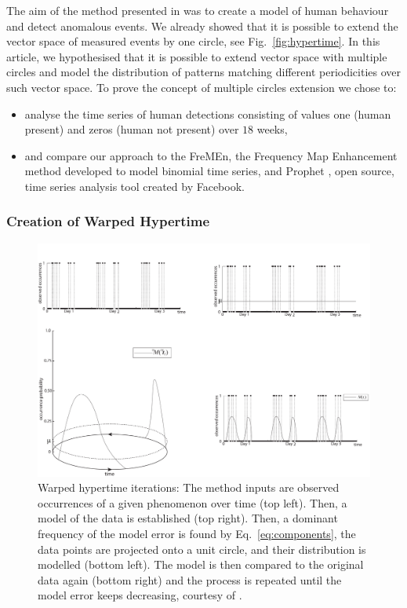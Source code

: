 The aim of the method presented in \cite{Vintr2018Spatiotemporal} was to create a model of human behaviour and detect anomalous events. 
We already showed that it is possible to extend the vector space of measured events by one circle, see Fig.~\ref{fig:hypertime}.
In this article, we hypothesised that it is possible to extend vector space with multiple circles and model the distribution of patterns matching different periodicities over such vector space.
To prove the concept of multiple circles extension we chose to: 
\begin{itemize}
    \item analyse the time series of human detections consisting of values one (human present) and zeros (human not present) over $18$ weeks, 
    \item and compare our approach to the FreMEn, the Frequency Map Enhancement method \cite{krajnik2017fremen} developed to model binomial time series, and Prophet \cite{taylor2018forecasting}, open source, time series analysis tool created by Facebook.
\end{itemize}

\subsubsection{Creation of Warped Hypertime}\label{sec:whyte}

\begin{figure}[!t]
\begin{center}
    \includegraphics[width=1.0\columnwidth]{fig/hypertime_graphs_a}
    \caption{Warped hypertime iterations: The method inputs are observed occurrences of a given phenomenon over time (top left). Then, a model of the data is established (top right). Then, a dominant frequency of the model error is found by Eq.~\ref{eq:components}, the data points are projected onto a unit circle, and their distribution is modelled (bottom left). The model is then compared to the original data again (bottom right) and the process is repeated until the model error keeps decreasing, courtesy of \cite{Vintr2018Practical}.\label{fig:whyte}}

\end{center}
\end{figure}



